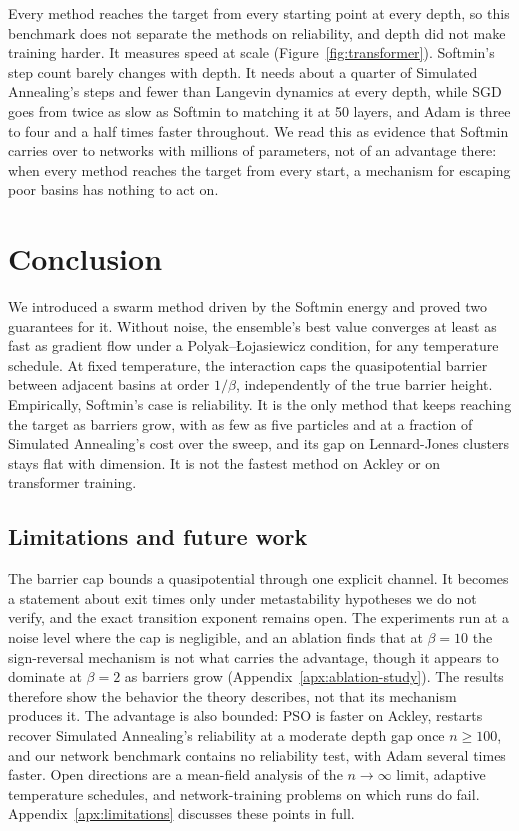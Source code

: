 \documentclass{article} %
\theoremstyle{plain}
\theoremstyle{definition}
\theoremstyle{remark}
\begin{document}
Every method reaches the target from every starting point at every depth, so this benchmark does not separate the methods on reliability, and depth did not make training harder. It measures speed at scale (Figure~\ref{fig:transformer}). Softmin's step count barely changes with depth. It needs about a quarter of Simulated Annealing's steps and fewer than Langevin dynamics at every depth, while SGD goes from twice as slow as Softmin to matching it at 50 layers, and Adam is three to four and a half times faster throughout. We read this as evidence that Softmin carries over to networks with millions of parameters, not of an advantage there: when every method reaches the target from every start, a mechanism for escaping poor basins has nothing to act on.

\section{Conclusion}

We introduced a swarm method driven by the Softmin energy and proved two guarantees for it. Without noise, the ensemble's best value converges at least as fast as gradient flow under a Polyak--\L{}ojasiewicz condition, for any temperature schedule. At fixed temperature, the interaction caps the quasipotential barrier between adjacent basins at order $1/\beta$, independently of the true barrier height. Empirically, Softmin's case is reliability. It is the only method that keeps reaching the target as barriers grow, with as few as five particles and at a fraction of Simulated Annealing's cost over the sweep, and its gap on Lennard-Jones clusters stays flat with dimension. It is not the fastest method on Ackley or on transformer training.

\subsection{Limitations and future work}
\label{sec:limitations}
The barrier cap bounds a quasipotential through one explicit channel. It becomes a statement about exit times only under metastability hypotheses we do not verify, and the exact transition exponent remains open. The experiments run at a noise level where the cap is negligible, and an ablation finds that at $\beta=10$ the sign-reversal mechanism is not what carries the advantage, though it appears to dominate at $\beta=2$ as barriers grow (Appendix~\ref{apx:ablation-study}). The results therefore show the behavior the theory describes, not that its mechanism produces it. The advantage is also bounded: PSO is faster on Ackley, restarts recover Simulated Annealing's reliability at a moderate depth gap once $n\geq100$, and our network benchmark contains no reliability test, with Adam several times faster. Open directions are a mean-field analysis of the $n\to\infty$ limit, adaptive temperature schedules, and network-training problems on which runs do fail. Appendix~\ref{apx:limitations} discusses these points in full.
\end{document}
